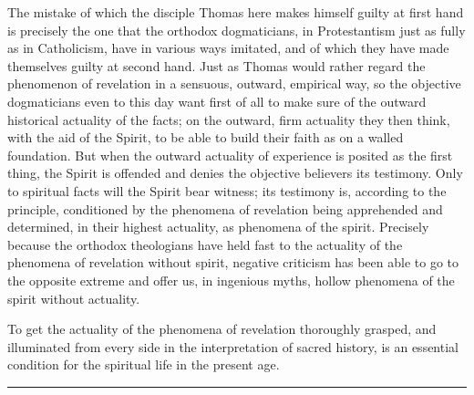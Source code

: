 \documentclass[12pt]{book}
\newcommand{\opage}[1]{\marginnote{\footnotesize\textit{[#1]}}}
\begin{document}
The mistake of which the disciple Thomas here makes himself guilty at
first hand is precisely the one that the orthodox dogmaticians, in
Protestantism just as fully as in
\opage{175}\setcounter{footnote}{0}%
Catholicism, have in various ways imitated, and of which they have made
themselves guilty at second hand. Just as Thomas would rather regard the
phenomenon of revelation in a sensuous, outward, empirical way, so the
objective dogmaticians even to this day want first of all to make sure
of the outward historical actuality of the facts; on the outward, firm
actuality they then think, with the aid of the Spirit, to be able to
build their faith as on a walled foundation. But when the outward
actuality of experience is posited as the first thing, the Spirit is
offended and denies the objective believers its testimony. Only to
spiritual facts will the Spirit bear witness; its testimony is,
according to the principle, conditioned by the phenomena of revelation
being apprehended and determined, in their highest actuality, as
phenomena of the spirit. Precisely because the orthodox theologians have
held fast to the actuality of the phenomena of revelation without
spirit, negative criticism has been able to go to the opposite extreme
and offer us, in ingenious myths, hollow phenomena of the spirit without
actuality.

To get the actuality of the phenomena of revelation thoroughly grasped,
and illuminated from every side in the interpretation of sacred
history, is an essential condition for the spiritual life in the present
age.

\begin{center}\rule{3cm}{0.4pt}\end{center}
\end{document}
